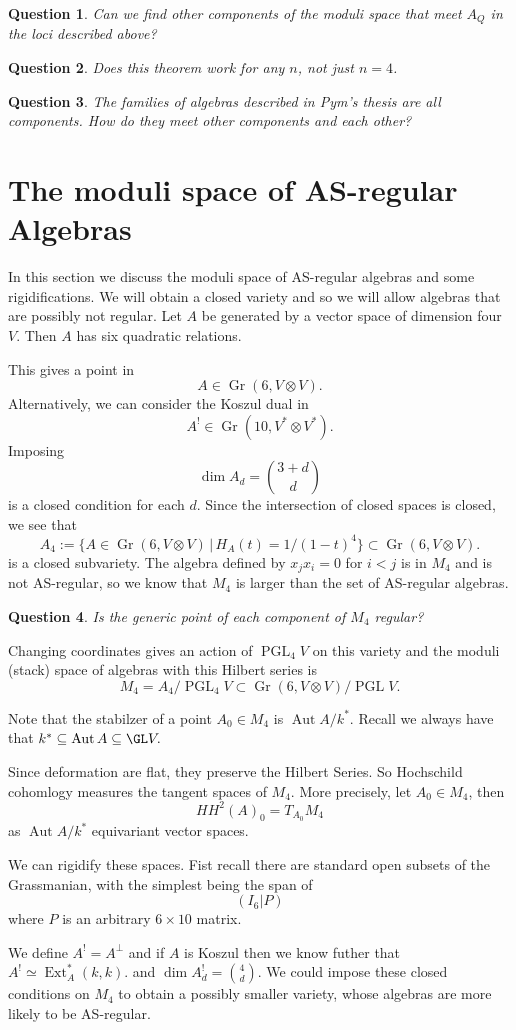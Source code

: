 \documentclass{article}
\newtheorem{question}{Question}
\DeclareMathOperator{\PGL}{PGL}
\DeclareMathOperator{\Gr}{Gr}
\DeclareMathOperator{\Ext}{Ext}
\DeclareMathOperator{\Aut}{Aut}
\begin{document}
\begin{question}
Can we find other components of the moduli space that meet $A_Q$ in the loci described above?
\end{question}
\begin{question}
  Does this theorem work for any $n$, not just $n=4$.
\end{question}
\begin{question}
  The families of algebras described in Pym's thesis are all components.  How do they meet other components and each other?
\end{question}

\section{The moduli space of AS-regular Algebras}
In this section we discuss the moduli space of AS-regular algebras and some rigidifications. We will obtain a closed variety and so we will allow algebras that are possibly not regular.
Let $A$ be generated by a vector space of dimension four $V$.
Then $A$ has six quadratic relations.


This gives a point in
$$A \in \Gr(6, V\otimes V).$$  Alternatively, we can consider the Koszul dual in
$$A^! \in \Gr(10, V^*\otimes V^*).$$  Imposing
$$\dim A_d = \binom{3+d}{d}$$
is a closed condition for each $d$.  Since the intersection of closed spaces is closed, we see that
$$ A_4 := \{ A \in \Gr(6,V\otimes V) \,|\, H_A(t) = 1/(1-t)^4\}
\subset \Gr(6,V\otimes V).$$ is a closed subvariety.
The algebra defined by $x_jx_i = 0$ for $i<j$ is in $M_4$ and is not AS-regular, so we know that $M_4$ is larger than the set of AS-regular algebras.
\begin{question} Is the generic point of each component of $M_4$ regular?
  \end{question}
Changing coordinates gives an action of
$\PGL_4V$ on this variety and the moduli (stack) space
of algebras with this Hilbert series is
$$ M_4 = A_4/\PGL_4V \subset \Gr(6,V\otimes V)/\PGL V.$$

Note that the stabilzer of a point $A_0 \in M_4$ is $\Aut A/k^*$.
Recall we always have that $k^* \subseteq \Aut A \subseteq \GL V.$

Since deformation are flat, they preserve the Hilbert Series.  So Hochschild cohomlogy measures the tangent spaces of $M_4$.  More precisely, let $A_0 \in M_4$,
then $$HH^2(A)_0 = T_{A_0} M_4$$ as $\Aut A/k^*$ equivariant vector spaces.

We can rigidify these spaces.  Fist recall there are standard open subsets of the Grassmanian, with the simplest being the span of 
$$( I_6 |P)$$ where
$P$ is an arbitrary $6 \times 10$ matrix.



We define $A^! = A^\perp$ and if
$A$ is Koszul then we know futher that $A^! \simeq \Ext^*_A(k,k).$
and $\dim A^!_d = \binom{4}{d}$.  We could impose these closed conditions on $M_4$ to obtain a possibly smaller variety, whose algebras are more likely to be AS-regular.
\end{document}
